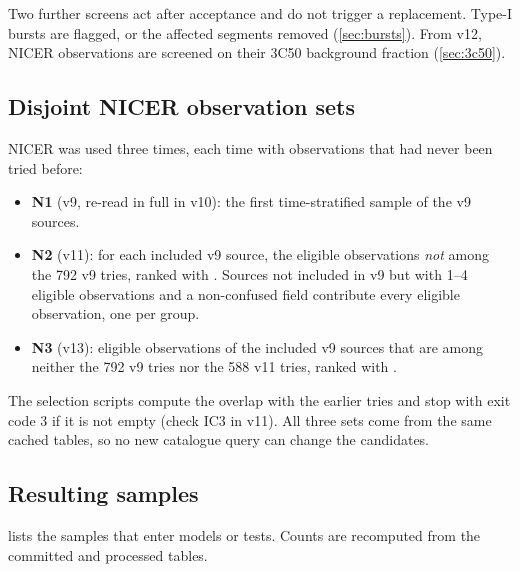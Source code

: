 Two further screens act after acceptance and do not trigger a replacement. Type-I bursts are flagged, or the affected
segments removed (\cref{sec:bursts}). From v12, NICER observations are screened on their 3C50 background fraction
(\cref{sec:3c50}).

\subsection{Disjoint NICER observation sets}\label{sec:disjoint}
NICER was used three times, each time with observations that had never been tried before:
\begin{itemize}
\item \textbf{N1} (v9, re-read in full in v10): the first time-stratified sample of the v9 sources.
\item \textbf{N2} (v11): for each included v9 source, the eligible observations \emph{not} among the 792 v9 tries, ranked
with . Sources not included in v9 but with 1--4 eligible observations and a non-confused field
contribute every eligible observation, one per group.
\item \textbf{N3} (v13): eligible observations of the included v9 sources that are among neither the 792 v9 tries nor the
588 v11 tries, ranked with .
\end{itemize}
The selection scripts compute the overlap with the earlier tries and stop with exit code 3 if it is not empty (check IC3 in
v11). All three sets come from the same cached  tables, so no new catalogue query can change the
candidates.

\subsection{Resulting samples}\label{sec:samplesizes}
 lists the samples that enter models or tests. Counts are recomputed from the committed
 and processed tables.

